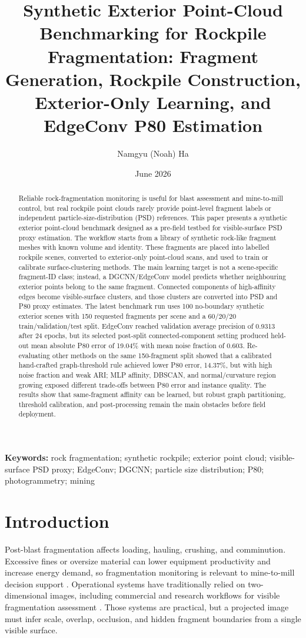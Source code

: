 \documentclass[11pt]{article}
\title{Synthetic Exterior Point-Cloud Benchmarking for Rockpile Fragmentation: Fragment Generation, Rockpile Construction, Exterior-Only Learning, and EdgeConv P80 Estimation}
\author[1]{Namgyu (Noah) Ha}
\affil[1]{Department of Energy and Resources Engineering, National Korea Maritime and Ocean University, Busan, Republic of Korea}
\date{June 2026}
\begin{document}
\maketitle

\begin{abstract}
Reliable rock-fragmentation monitoring is useful for blast assessment and mine-to-mill control, but real rockpile point clouds rarely provide point-level fragment labels or independent particle-size-distribution (PSD) references. This paper presents a synthetic exterior point-cloud benchmark designed as a pre-field testbed for visible-surface PSD proxy estimation. The workflow starts from a library of synthetic rock-like fragment meshes with known volume and identity. These fragments are placed into labelled rockpile scenes, converted to exterior-only point-cloud scans, and used to train or calibrate surface-clustering methods. The main learning target is not a scene-specific fragment-ID class; instead, a DGCNN/EdgeConv model predicts whether neighbouring exterior points belong to the same fragment. Connected components of high-affinity edges become visible-surface clusters, and those clusters are converted into PSD and P80 proxy estimates. The latest benchmark run uses 100 no-boundary synthetic exterior scenes with 150 requested fragments per scene and a 60/20/20 train/validation/test split. EdgeConv reached validation average precision of 0.9313 after 24 epochs, but its selected post-split connected-component setting produced held-out mean absolute P80 error of 19.04\% with mean noise fraction of 0.603. Re-evaluating other methods on the same 150-fragment split showed that a calibrated hand-crafted graph-threshold rule achieved lower P80 error, 14.37\%, but with high noise fraction and weak ARI; MLP affinity, DBSCAN, and normal/curvature region growing exposed different trade-offs between P80 error and instance quality. The results show that same-fragment affinity can be learned, but robust graph partitioning, threshold calibration, and post-processing remain the main obstacles before field deployment.
\end{abstract}

\textbf{Keywords:} rock fragmentation; synthetic rockpile; exterior point cloud; visible-surface PSD proxy; EdgeConv; DGCNN; particle size distribution; P80; photogrammetry; mining

\section{Introduction}
Post-blast fragmentation affects loading, hauling, crushing, and comminution. Excessive fines or oversize material can lower equipment productivity and increase energy demand, so fragmentation monitoring is relevant to mine-to-mill decision support \cite{cunningham1983,ouchterlony2005}. Operational systems have traditionally relied on two-dimensional images, including commercial and research workflows for visible fragmentation assessment \cite{palangio1995,siddiqui2009}. Those systems are practical, but a projected image must infer scale, overlap, occlusion, and hidden fragment boundaries from a single visible surface.
\end{document}
